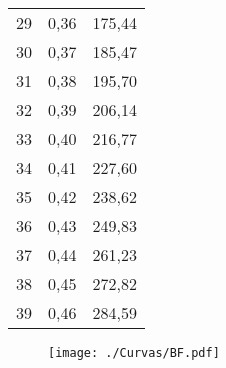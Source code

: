 \documentclass[]{article}
\begin{document}
\begin{longtable}[t]{ccc}
29 & 0,36 & 175,44\\
30 & 0,37 & 185,47\\
31 & 0,38 & 195,70\\
32 & 0,39 & 206,14\\
33 & 0,40 & 216,77\\
34 & 0,41 & 227,60\\
35 & 0,42 & 238,62\\
36 & 0,43 & 249,83\\
37 & 0,44 & 261,23\\
38 & 0,45 & 272,82\\
39 & 0,46 & 284,59\\*
\end{longtable}

\clearpage

\begin{sidewaysfigure}[htb]
   \centering
   \texttt{[image: ./Curvas/BF.pdf]}
\end{sidewaysfigure}

\clearpage
\end{document}
